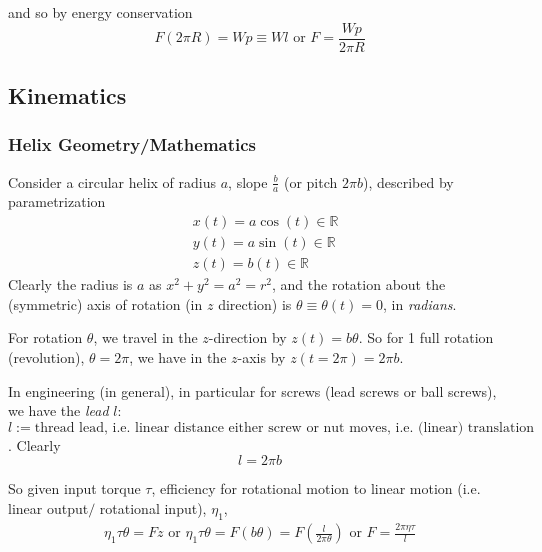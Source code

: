 \documentclass[10pt]{amsart}
\begin{document}
\begin{multicols*}{2}
and so by energy conservation
\[
F(2\pi R) = Wp \equiv Wl \text{ or } F = \frac{Wp }{2\pi R}
\]

\subsection{Kinematics}

\subsubsection{Helix Geometry/Mathematics}

Consider a circular helix of radius $a$, slope $\frac{b}{a}$ (or pitch $2\pi b$), described by parametrization 
\[
\begin{aligned}
	& x(t) = a \cos{(t)} \in \mathbb{R} \\ 
		& y(t) = a \sin{(t)} \in \mathbb{R} \\ 
	& z(t) = b(t) \in \mathbb{R}
\end{aligned}
\]
Clearly the radius is $a$ as $x^2 + y^2 = a^2 = r^2$, and the rotation about the (symmetric) axis of rotation (in $z$ direction) is $\theta \equiv \theta(t) = 0$, in \emph{radians}.  

For rotation $\theta$, we travel in the $z$-direction by $z(t) =b\theta$.  So for 1 full rotation (revolution), $\theta = 2\pi$, we have in the $z$-axis by $z(t=2\pi) =2\pi b$.  

In engineering (in general), in particular for screws (lead screws or ball screws), we have the \emph{lead} $l$: \\
$l:= \text{thread lead, i.e. linear distance either screw or nut moves, i.e. (linear) translation length (for 1 full rotation (revolution)) }$.  Clearly
\begin{equation}
l = 2\pi b
\end{equation}

So given input torque $\tau$, efficiency for rotational motion to linear motion (i.e. linear output$/$ rotational input), $\eta_1$, 
\begin{equation}
\begin{gathered}
\eta_1 \tau \theta = Fz \text{ or } \eta_1\tau \theta = F(b\theta) = F \left( \frac{l}{2\pi \theta } \right) \text{ or } \boxed{ F = \frac{2\pi \eta \tau }{l } }
\end{gathered}
\end{equation}









\end{multicols*}
\end{document}
